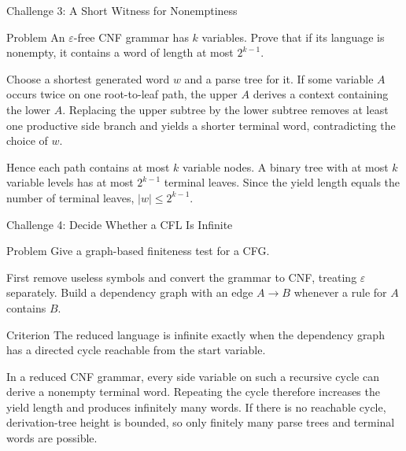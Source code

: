 \documentclass[10pt]{beamer}
\begin{document}
\begin{frame}{Challenge 3: A Short Witness for Nonemptiness}
  \small
  \begin{block}{Problem}
    An $\varepsilon$-free CNF grammar has $k$ variables. Prove that if its
    language is nonempty, it contains a word of length at most $2^{k-1}$.
  \end{block}
  Choose a shortest generated word $w$ and a parse tree for it. If some
  variable $A$ occurs twice on one root-to-leaf path, the upper $A$ derives a
  context containing the lower $A$. Replacing the upper subtree by the lower
  subtree removes at least one productive side branch and yields a shorter
  terminal word, contradicting the choice of $w$.
  \pause

  Hence each path contains at most $k$ variable nodes. A binary tree with at
  most $k$ variable levels has at most $2^{k-1}$ terminal leaves. Since the
  yield length equals the number of terminal leaves,
  $|w|\le2^{k-1}$.
\end{frame}

\begin{frame}{Challenge 4: Decide Whether a CFL Is Infinite}
  \small
  \begin{block}{Problem}
    Give a graph-based finiteness test for a CFG.
  \end{block}
  First remove useless symbols and convert the grammar to CNF, treating
  $\varepsilon$ separately. Build a dependency graph with an edge $A\to B$
  whenever a rule for $A$ contains $B$.
  \pause
  \begin{block}{Criterion}
    The reduced language is infinite exactly when the dependency graph has a
    directed cycle reachable from the start variable.
  \end{block}
  In a reduced CNF grammar, every side variable on such a recursive cycle can
  derive a nonempty terminal word. Repeating the cycle therefore increases the
  yield length and produces infinitely many words. If there is no reachable
  cycle, derivation-tree height is bounded, so only finitely many parse trees
  and terminal words are possible.
\end{frame}
\end{document}
